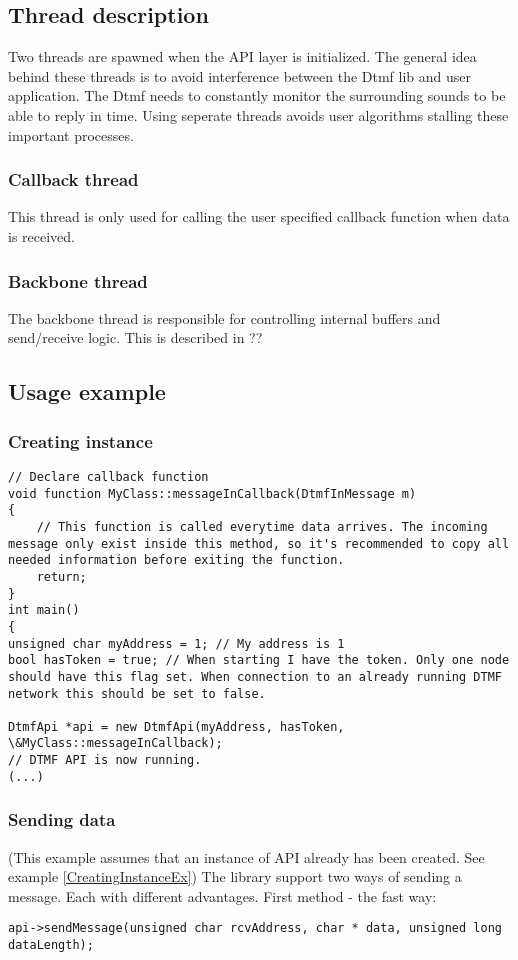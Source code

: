 \subsection{Thread description}
Two threads are spawned when the API layer is initialized. The general idea behind these threads is to avoid interference between the Dtmf lib and user application. The Dtmf needs to constantly monitor the surrounding sounds to be able to reply in time. Using seperate threads avoids user algorithms stalling these important processes.

\subsubsection{Callback thread}
This thread is only used for calling the user specified callback function when data is received. 

\subsubsection{Backbone thread}
The backbone thread is responsible for controlling internal buffers and send/receive logic. This is described in ?? 


\subsection{Usage example}
\subsubsection{Creating instance}
\begin{lstlisting}[float=htb,language={[ANSI]C++},caption={Creating instance example},label=CreatingInstanceEx]
// Declare callback function
void function MyClass::messageInCallback(DtmfInMessage m)
{
    // This function is called everytime data arrives. The incoming message only exist inside this method, so it's recommended to copy all needed information before exiting the function.
    return;
}
int main()
{
unsigned char myAddress = 1; // My address is 1
bool hasToken = true; // When starting I have the token. Only one node should have this flag set. When connection to an already running DTMF network this should be set to false.

DtmfApi *api = new DtmfApi(myAddress, hasToken, \&MyClass::messageInCallback);
// DTMF API is now running.
(...)
\end{lstlisting}

\subsubsection{Sending data}
(This example assumes that an instance of API already has been created. See example \ref{CreatingInstanceEx})
The library support two ways of sending a message. Each with different advantages.
First method - the fast way:
\begin{lstlisting}[float=htb,language={[ANSI]C++},caption={Sending data example 1},label=SendingDataEx1]
api->sendMessage(unsigned char rcvAddress, char * data, unsigned long dataLength);
\end{lstlisting}


